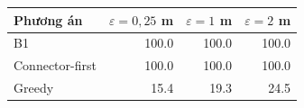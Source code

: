 \begin{tabular}{lrrr}
\toprule
Phương án & $\varepsilon=0{,}25$ m & $\varepsilon=1$ m & $\varepsilon=2$ m \\
\midrule
B1 & 100.0 & 100.0 & 100.0 \\
Connector-first & 100.0 & 100.0 & 100.0 \\
Greedy & 15.4 & 19.3 & 24.5 \\
\bottomrule
\end{tabular}
